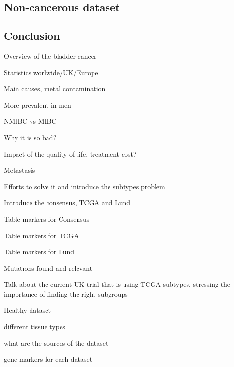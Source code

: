 \subsection{Non-cancerous dataset}





\subsection{Conclusion}


\pagebreak

\begin{todolist}
    \item Overview of the bladder cancer 
    \begin{todolist}
        \item [\done] Statistics worlwide/UK/Europe
        \item [\done] Main causes, metal contamination
        \item [\done] More prevalent in men
        \item [\done] NMIBC vs MIBC
    \end{todolist}
    \item Why it is so bad? 
    \begin{todolist}
        \item [\done] Impact of the quality of life, treatment cost?
        \item [\done] Metastasis
    \end{todolist}
    \item Efforts to solve it and introduce the subtypes problem
    \item Introduce the consensus, TCGA and Lund
    \begin{todolist}
        \item Table markers for Consensus
        \item Table markers for TCGA
        \item Table markers for Lund
        \item Mutations found and relevant
    \end{todolist}
    \item Talk about the current UK trial that is using TCGA subtypes, stressing the importance of finding the right subgroups
    \item Healthy dataset 
    \begin{todolist}
        \item different tissue types
        \item what are the sources of the dataset
        \item gene markers for each dataset
    \end{todolist}

\end{todolist}